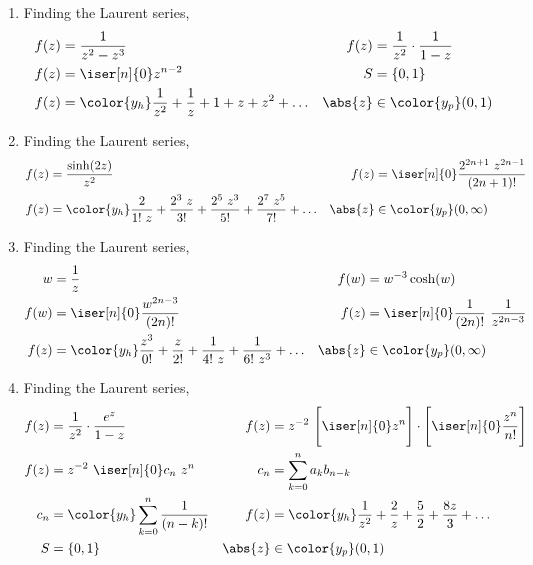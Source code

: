 \begin{enumerate}
    \item Finding the Laurent series,
          \begin{align}
              f(z)    & = \frac{1}{z^2 - z^3}                    &
              f(z)    & = \frac{1}{z^2} \cdot \frac{1}{1 - z}      \\
              f(z)    & = \iser[n]{0} z^{n-2}                    &
              S       & = \{0, 1\}                                 \\
              f(z)    & = \color{y_h}\frac{1}{z^2} + \frac{1}{z}
              + 1 + z + z^2 + \dots
                      &
              \abs{z} & \in \color{y_p} (0, 1)
          \end{align}

    \item Finding the Laurent series,
          \begin{align}
              f(z)    & = \frac{\sinh(2z)}{z^2}                          &
              f(z)    & = \iser[n]{0} \frac{2^{2n+1}\ z^{2n-1}}{(2n+1)!}   \\
              f(z)    & = \color{y_h}\frac{2}{1!\ z} + \frac{2^3\ z}{3!}
              + \frac{2^5\ z^3}{5!} + \frac{2^7\ z^5}{7!} + \dots
                      &
              \abs{z} & \in \color{y_p} (0, \infty)
          \end{align}

    \item Finding the Laurent series,
          \begin{align}
              w       & = \frac{1}{z}                                       &
              f(w)    & = w^{-3} \cosh(w)                                     \\
              f(w)    & = \iser[n]{0} \frac{w^{2n - 3}}{(2n)!}              &
              f(z)    & = \iser[n]{0} \frac{1}{(2n)!}\ \frac{1}{z^{2n - 3}}   \\
              f(z)    & = \color{y_h}\frac{z^3}{0!} + \frac{z}{2!}
              + \frac{1}{4!\ z} + \frac{1}{6!\ z^3}
              + \dots &
              \abs{z} & \in \color{y_p} (0, \infty)
          \end{align}

    \item Finding the Laurent series,
          \begin{align}
              f(z)    & = \frac{1}{z^2} \cdot \frac{e^z}{1 - z}       &
              f(z)    & = z^{-2}\ \Bigg[\iser[n]{0} z^{n}\Bigg] \cdot
              \Bigg[\iser[n]{0} \frac{z^n}{n!} \Bigg]                   \\
              f(z)    & = z^{-2}\ \iser[n]{0} c_n\ z^n                &
              c_n     & = \sum_{k=0}^{n} a_k b_{n-k}                    \\
              c_n     & = \color{y_h} \sum_{k=0}^{n} \frac{1}{(n-k)!} &
              f(z)    & = \color{y_h}\frac{1}{z^2} + \frac{2}{z}
              + \frac{5}{2} + \frac{8z}{3} + \dots                      \\
              S       & = \{0, 1\}                                    &
              \abs{z} & \in \color{y_p} (0, 1)
          \end{align}


\end{enumerate}
